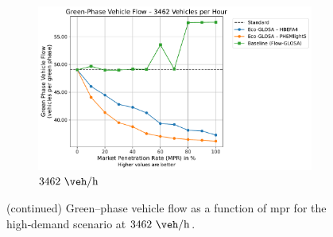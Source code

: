 \begin{figure}[htb]\ContinuedFloat
  \centering
  \begin{subfigure}[t]{0.98\textwidth}
    \includegraphics[width=\textwidth]{data/img/GreenPhaseVehicleFlow/GreenPhaseVehicleFlow_Cars2500.pdf}
    \caption{$3462~\unit{\veh\per\hour}$}
    \label{fig:flow_3462}
  \end{subfigure}
  \caption[]{%
    (continued) Green–phase vehicle flow as a function of \ac{mpr} for the high‐demand scenario at $3462~\unit{\veh\per\hour}$.%
  }
\end{figure}

